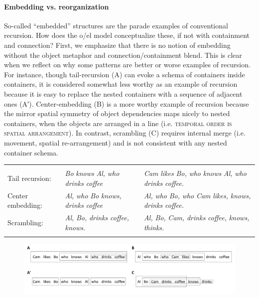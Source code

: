 \paragraph{Embedding vs. reorganization}

So-called “embedded” structures are the parade examples of conventional recursion. How does the o/el model conceptualize these, if not with containment and connection? First, we emphasize that there is no notion of embedding without the object metaphor and connection/containment blend. This is clear when we reflect on why some patterns are better or worse examples of recursion. For instance, though tail-recursion (A) can evoke a schema of containers inside containers, it is considered somewhat less worthy as an example of recursion because it is easy to replace the nested containers with a sequence of adjacent ones (A′). Center-embedding (B) is a more worthy example of recursion because the mirror spatial symmetry of object dependencies maps nicely to nested containers, when the objects are arranged in a line (i.e. \textsc{temporal} \textsc{order} \textsc{is} \textsc{spatial} \textsc{arrangement}). In contrast, scrambling (C) requires internal merge (i.e. movement, spatial re-arrangement) and is not consistent with any nested container schema.

\begin{tabularx}{\textwidth}{XXX} &  & \\
\lsptoprule
Tail recursion: & \textit{Bo} \textit{knows} \textit{Al,} \textit{who} \textit{drinks} \textit{coffee} & \textit{Cam} \textit{likes} \textit{Bo,} \textit{who} \textit{knows} \textit{Al,} \textit{who} \textit{drinks} \textit{coffee.}\\
Center embedding: & \textit{Al,} \textit{who} \textit{Bo} \textit{knows,} \textit{drinks} \textit{coffee} & \textit{Al,} \textit{who} \textit{Bo,} \textit{who} \textit{Cam} \textit{likes,} \textit{knows,} \textit{drinks} \textit{coffee.}\\
Scrambling: & \textit{Al,} \textit{Bo,} \textit{drinks} \textit{coffee,} \textit{knows.} & \textit{Al,} \textit{Bo,} \textit{Cam,} \textit{drinks} \textit{coffee,} \textit{knows,} \textit{thinks.}\\
\lspbottomrule
\end{tabularx}
  
\begin{figure}
\includegraphics[width=\textwidth]{figures/Tilsen-img118.png}
\caption{\missingcaption}
\label{fig:}
\end{figure}
 

